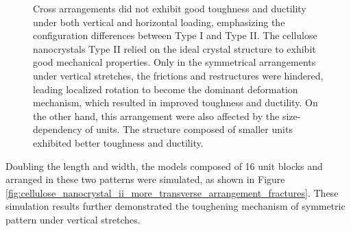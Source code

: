 \documentclass{article}
\begin{document}
\begin{figure}[htbp]
{    Cross arrangements did not exhibit good toughness and ductility under both vertical and horizontal loading, emphasizing the configuration differences between Type I and Type II.
    The cellulose nanocrystals Type II relied on the ideal crystal structure to exhibit good mechanical properties.
    Only in the symmetrical arrangements under vertical stretches, the frictions and restructures were hindered, leading localized rotation to become the dominant deformation mechanism, which resulted in improved toughness and ductility.
    On the other hand, this arrangement were also affected by the size-dependency of units.
    The structure composed of smaller units exhibited better toughness and ductility.
    }
    \label{fig:cellulose_nanocrystal_ii_transverse_arrangement_fractures}
\end{figure}

\clearpage

Doubling the length and width, the models composed of 16 unit blocks and arranged in these two patterns were simulated, as shown in Figure \ref{fig:cellulose_nanocrystal_ii_more_transverse_arrangement_fractures}.
These simulation results further demonstrated the toughening mechanism of symmetric pattern under vertical stretches.
\end{document}
